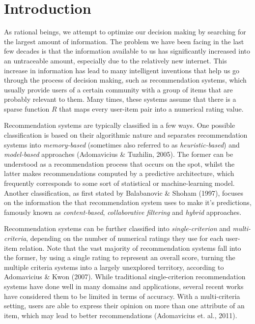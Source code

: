 \documentclass[sigconf,authordraft]{acmart}
\begin{document}
\section{Introduction}

As rational beings, we attempt to optimize our decision making by searching for the largest amount of information. The problem we have been facing in the last few decades is that the information available to us has significantly increased into an untraceable amount, especially due to the relatively new internet. This increase in information has lead to many intelligent inventions that help us go through the process of decision making, such as recommendation systems, which usually provide users of a certain community with a group of items that are probably relevant to them. Many times, these systems assume that there is a sparse function $R$ that maps every user-item pair into a numerical rating value.

Recommendation systems are typically classified in a few ways. One possible classification is based on their algorithmic nature and separates recommendation systems into \textit{memory-based} (sometimes also referred to as \textit{heuristic-based}) and \textit{model-based} approaches (Adomavicius \& Tuzhilin, 2005). The former can be understood as a recommendation process that occurs on the spot, whilst the latter makes recommendations computed by a predictive architecture, which frequently corresponds to some sort of statistical or machine-learning model. Another classification, as first stated by Balabanovic \& Shoham (1997), focuses on the information the that recommendation system uses to make it's predictions, famously known as \textit{content-based}, \textit{collaborative filtering} and \textit{hybrid} approaches.

Recommendation systems can be further classified into \textit{single-criterion} and \textit{multi-criteria}, depending on the number of numerical ratings they use for each user-item relation. Note that the vast majority of recommendation systems fall into the former, by using a single rating to represent an overall score, turning the multiple criteria systems into a largely unexplored territory, according to Adomavicius \& Kwon (2007). While traditional single-criterion recommendation systems have done well in many domains and applications, several recent works have considered them to be limited in terms of accuracy. With a multi-criteria setting, users are able to express their opinion on more than one attribute of an item, which may lead to better recommendations (Adomavicius et. al., 2011).
\end{document}
